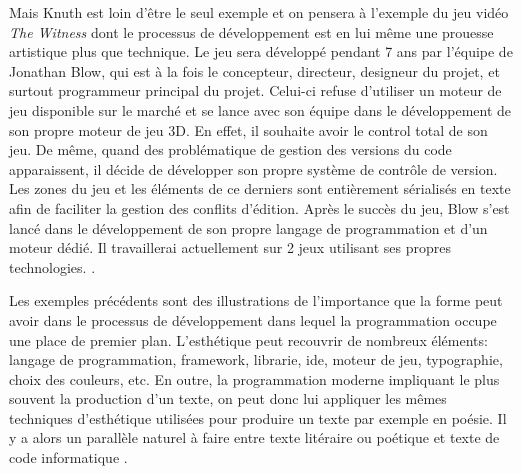 \documentclass[12pt]{article} %
\begin{document}
Mais Knuth est loin d'être le seul exemple et on pensera à l'exemple du jeu vidéo \textit{The Witness} dont le processus de développement est en lui même une prouesse artistique plus que technique. Le jeu sera développé pendant 7 ans par l'équipe de Jonathan Blow, qui est à la fois le concepteur, directeur, designeur du projet, et surtout programmeur principal du projet. Celui-ci refuse d'utiliser un moteur de jeu disponible sur le marché et se lance avec son équipe dans le développement de son propre moteur de jeu 3D. En effet, il souhaite avoir le control total de son jeu. De même, quand des problématique de gestion des versions du code apparaissent, il décide de développer son propre système de contrôle de version. Les zones du jeu et les éléments de ce derniers sont entièrement sérialisés en texte afin de faciliter la gestion des conflits d'édition. Après le succès du jeu, Blow s'est lancé dans le développement de son propre langage de programmation et d'un moteur dédié. Il travaillerai actuellement sur 2 jeux utilisant ses propres technologies. \cite{Takahashi2018-cb}.

Les exemples précédents sont des illustrations de l'importance que la forme peut avoir dans le processus de développement dans lequel la programmation occupe une place de premier plan. L'esthétique peut recouvrir de nombreux éléments: langage de programmation, framework, librarie, \acrshort{ide}, moteur de jeu, typographie, choix des couleurs, etc. En outre, la programmation moderne impliquant le plus souvent la production d'un texte, on peut donc lui appliquer les mêmes techniques d'esthétique utilisées pour produire un texte par exemple en poésie. Il y a alors un parallèle naturel à faire entre texte litéraire ou poétique et texte de code informatique \cite{FCramer2001}.
\end{document}
